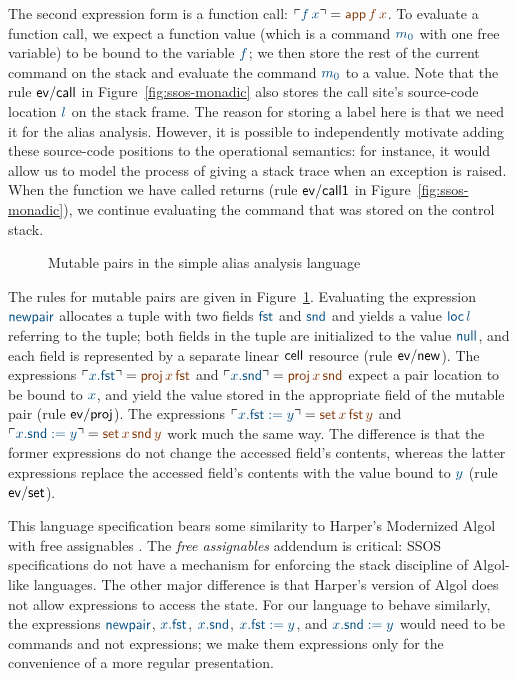 The second expression form is a function call: $\interp{f\,x} = \lf{{\sf
  app}\,f\,x}$. To evaluate a function call, we expect a function value
(which is a command $\obj{m_0}$ with one free variable) to be bound to the
variable $\obj{f}$; we then store the rest of the current command on the
stack and evaluate the command $\obj{m_0}$ to a value. Note that the rule
${\sf ev/call}$ in Figure~\ref{fig:ssos-monadic} also stores the call
site's source-code location $\obj{l}$ on the stack frame. The reason for
storing a label here is that we need it for the alias
analysis. However, it is possible to independently motivate adding
these source-code positions to the operational semantics: for instance, it
would allow us to model the process of giving a stack trace when an
exception is raised. When the function we have called returns (rule
${\sf ev/call1}$ in Figure~\ref{fig:ssos-monadic}), we continue
evaluating the command that was stored on the control stack.

\begin{figure}
\caption{Mutable pairs in the simple alias analysis language}
\label{fig:ssos-monadic2}
\end{figure}

The rules for mutable pairs are given in
Figure~\ref{fig:ssos-monadic2}. Evaluating the expression $\obj{\sf
  newpair}$ allocates a tuple with two fields $\obj{\sf fst}$ and 
$\obj{\sf
  snd}$ and yields a value $\obj{{\sf loc}\,l}$ referring to the tuple; both
fields in the tuple are initialized to the value $\obj{\sf null}$, and
each field is represented by a separate linear ${\sf cell}$ resource
(rule ${\sf ev/new}$). The expressions $\interp{x.{\sf fst}} = \lf{{\sf
  proj}\,x\,{\sf fst}}$ and $\interp{x.{\sf snd}} = \lf{{\sf proj}\,x\,{\sf
  snd}}$ expect a pair location to be bound to $\obj{x}$, and yield the value
stored in the appropriate field of the mutable pair (rule ${\sf
  ev/proj}$). The expressions $\interp{x.{\sf fst} := y} = \lf{{\sf
  set}\,x\,{\sf fst}\,y}$ and $\interp{x.{\sf snd} := y} = \lf{{\sf
  set}\,x\,{\sf snd}\,y}$ work much the same way. The difference is
that the former expressions do not change the accessed field's
contents, whereas the latter expressions replace the accessed field's
contents with the value bound to $\obj{y}$ (rule ${\sf ev/set}$).

This language specification bears some similarity to Harper's
Modernized Algol with free assignables \cite[Chapter
36]{harper12practical}. The {\it free assignables} addendum is
critical: SSOS specifications do not have a mechanism for enforcing
the stack discipline of Algol-like languages. The other major
difference is that Harper's version of Algol does not allow
expressions to access the state.  For our language to behave
similarly, the expressions $\obj{\sf newpair}$, $\obj{x.{\sf fst}}$, 
$\obj{x.{\sf
  snd}}$, $\obj{x.{\sf fst} := y}$, and 
$\obj{x.{\sf snd} := y}$ would need to be
commands and not expressions; we make them expressions only for the
convenience of a more regular presentation.

